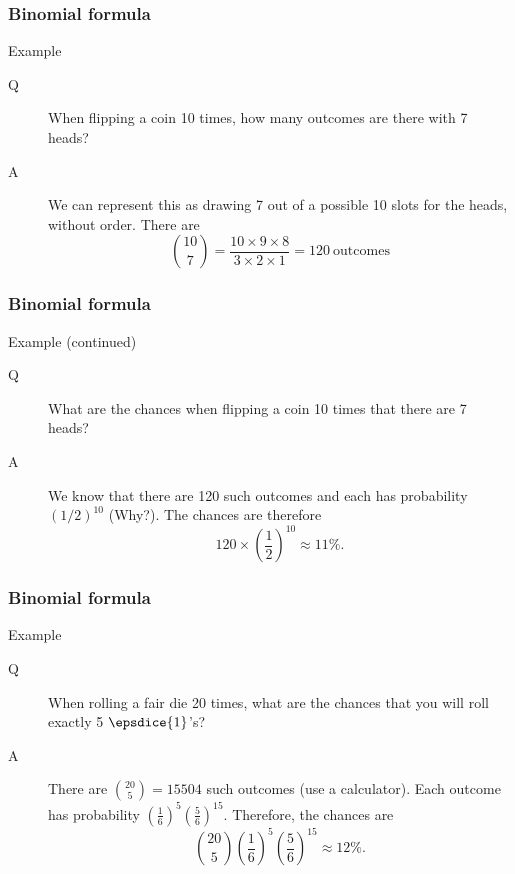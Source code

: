 \documentclass[handout]{beamer}
\begin{document}

   \begin{frame} \frametitle{Binomial formula}

   \begin{block}
   {Example}

   \begin{description}
   \item[Q]    When flipping a coin 10 times, how many outcomes are there
   with 7 heads?

   \item[A] We can represent this as drawing 7 out of a possible
   10 slots for the heads, without order. There are
   $$
   \binom{10}{7} = \frac{10 \times 9 \times 8}{3 \times 2 \times 1} = 120 \
   \text{outcomes}   $$
   \end{description}

   \end{block}
   \end{frame}


   \begin{frame} \frametitle{Binomial formula}

   \begin{block}
   {Example (continued)}

   \begin{description}
   \item[Q]    What are the chances when flipping a coin 10 times that there
   are 7 heads?

   \item[A] We know that there are 120 such outcomes and each has probability
   $(1/2)^{10}$ (Why?). The chances are therefore
   $$
   120 \times \left(\frac{1}{2} \right)^{10} \approx 11 \%.
   $$
   \end{description}

   \end{block}
   \end{frame}


   \begin{frame} \frametitle{Binomial formula}

   \begin{block}
   {Example}
   \begin{description}
   \item[Q] When rolling a fair die 20 times, what are the chances
   that you will roll exactly 5 $\epsdice{1}$'s?

   \item[A] There are $\binom{20}{5} = 15504$ such outcomes (use a calculator).
   Each outcome has probability $(\frac{1}{6})^5 (\frac{5}{6})^{15}$.
   Therefore, the chances are
   $$
   \binom{20}{5} \left(\frac{1}{6} \right)^5 \left(\frac{5}{6} \right)^{15} \approx 12\%.
   $$
   \end{description}
   \end{block}
   \end{frame}
\end{document}
